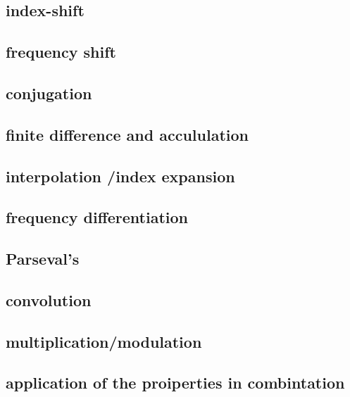 \documentclass{article}
\begin{document}
\subsection{index-shift}
\label{sec:org31f43b8}

\subsection{frequency shift}
\label{sec:org52b250f}

\subsection{conjugation}
\label{sec:orgfd0a284}

\subsection{finite difference and accululation}
\label{sec:orgf78b609}

\subsection{interpolation /index expansion}
\label{sec:orge721dbd}

\subsection{frequency differentiation}
\label{sec:orgf122f6b}

\subsection{Parseval's}
\label{sec:orge091617}

\subsection{convolution}
\label{sec:orgd4030e8}

\subsection{multiplication/modulation}
\label{sec:org290cfde}

\subsection{application of the proiperties in combintation}
\label{sec:orgb8ac360}

\newpage
\end{document}
